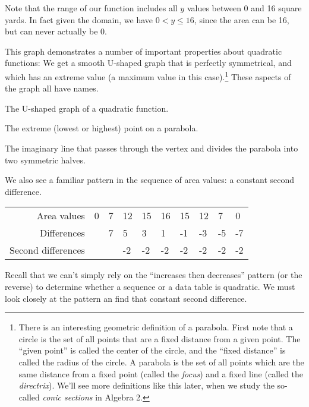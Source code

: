 Note that the range of our function includes all $y$ values between 0 and 16 square yards. In fact given the domain, we have $0 < y \leq 16$, since the area can be 16, but can never actually be 0.

This graph demonstrates a number of important properties about quadratic functions: We get a smooth U-shaped graph that is perfectly symmetrical, and which has an extreme value (a maximum value in this case).\footnote{There is an interesting geometric definition of a parabola. First note that a circle is the set of all points that are a fixed distance from a given point. The ``given point'' is called the center of the circle, and the ``fixed distance'' is called the radius of the circle. A parabola is the set of all points which are the same distance from a fixed point (called the \textit{focus}) and a fixed line (called the \textit{directrix}). We'll see more definitions like this later, when we study the so-called \textit{conic sections} in Algebra 2.} These aspects of the graph all have names.

\begin{boxdef}[Parabola]
The U-shaped graph of a quadratic function.
\end{boxdef}

\begin{boxdef}[Vertex]
The extreme (lowest or highest) point on a parabola.
\end{boxdef}

\begin{boxdef}
The imaginary line that passes through the vertex and divides the parabola into two symmetric halves.
\end{boxdef}

We also see a familiar pattern in the sequence of area values: a constant second difference.

\begin{table}
\begin{tabular}{r|*{9}{C{0.75cm}}}
Area values			& 0 & 7 & 12 & 15 & 16 & 15 & 12 & 7 & 0\\
Differences			& ~ & 7 & 5 & 3 & 1 & -1 & -3 & -5 & -7\\
Second differences	& ~ & ~ & -2 & -2 & -2 & -2 & -2 & -2 & -2\\
\end{tabular}
\end{table}

Recall that we can't simply rely on the ``increases then decreases'' pattern (or the reverse) to determine whether a sequence or a data table is quadratic. We must look closely at the pattern an find that constant second difference.

